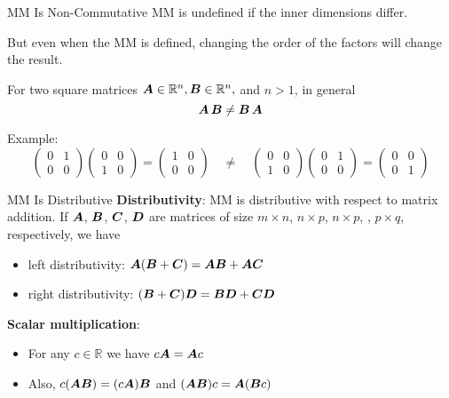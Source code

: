 \begin{frame}{MM Is Non-Commutative}
    MM is undefined if the inner dimensions differ.

    But even when the MM is defined, changing the order of the factors will change the result.

    \begin{boxed}
        For two square matrices $\bm{A} \in \mathbb{R}^n, \bm{B} \in \mathbb{R}^n,$ and $n > 1$, in general
        $$\bm{A}\,\bm{B} \ne \bm{B}\,\bm{A}$$
    \end{boxed}

    Example:
    $$\begin{pmatrix} 0 & 1 \\ 0 & 0 \end{pmatrix}\begin{pmatrix} 0 & 0 \\ 1 & 0 \end{pmatrix}=\begin{pmatrix} 1 & 0 \\ 0 & 0 \end{pmatrix}
        \quad \neq \quad
        \begin{pmatrix} 0 & 0 \\ 1 & 0 \end{pmatrix}\begin{pmatrix} 0 & 1 \\ 0 & 0 \end{pmatrix} = \begin{pmatrix} 0 & 0 \\ 0 & 1 \end{pmatrix}$$
\end{frame}

\begin{frame}{MM Is Distributive}
    \textbf{Distributivity}: MM is distributive with respect to matrix addition. If $\bm{A}$, $\bm{B}$, $\bm{C}$, $\bm{D}$ are
    matrices of size $m \times n$, $n \times p$, $n \times p$, , $p \times q$, respectively, we have
    \begin{itemize}
        \item left distributivity: $\bm{A}(\bm{B} + \bm{C}) = \bm{AB} + \bm{AC}$
        \item right distributivity: $(\bm{B} + \bm{C} )\bm{D} = \bm{BD} + \bm{CD}$
    \end{itemize}

    \textbf{Scalar multiplication}:
    \begin{itemize}
        \item For any $c \in \mathbb{R}$ we have $c\bm{A} = \bm{A}c$
        \item Also, $c(\bm{AB}) = (c \bm{A})\bm{B}$ and $(\bm{A} \bm{B})c=\bm{A}(\bm{B}c)$
    \end{itemize}
\end{frame}


